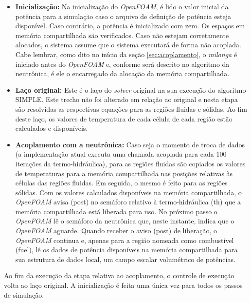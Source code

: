 \begin{itemize}
\item \textbf{Inicialização:} Na inicialização do \textit{OpenFOAM}, é lido o valor inicial da potência para
  a simulação caso o arquivo de definição de potência esteja disponível. Caso contrário, a potência é inicializado
  com zero. Os espaços em memória compartilhada são verificados. Caso não estejam corretamente alocados, o sistema
  assume que o sistema executará de forma não acoplada. Cabe lembrar, como dito no início da seção \ref{sec:acoplamento},
  o \textit{milonga} é iniciado antes do \textit{OpenFOAM} e, conforme será descrito no algoritmo da neutrônica, é
  ele o encarregado da alocação da memória compartilhada.

\item \textbf{Laço original:} Este é o laço do \textit{solver} original na sua execução do algoritmo SIMPLE. Este
  trecho não foi alterado em relação ao original e nesta etapa são resolvidas as respectivas equações
  para as regiões fluidas e sólidas. Ao fim
  deste laço, os valores de temperatura de cada célula de cada região estão calculados e disponíveis.

\item \textbf{Acoplamento com a neutrônica:} Caso seja o momento de troca de dados (a implementação atual
  executa uma chamada acoplada para cada 100 iterações da termo-hidráulica), para as regiões fluidas são copiados os valores
  de temperaturas para a memória compartilhada nas posições relativas às células das regiões fluidas. Em seguida, o mesmo
  é feito para as regiões sólidas. Com os valores calculados disponíveis na memória compartilhada, o \textit{OpenFOAM}
  avisa (post) no semáforo relativo à termo-hidráulica (th) que a memória compartilhada está liberada para uso. No próximo
  passo o \textit{OpenFOAM} lê o semáforo da neutrônica que, neste instante, indica que o \textit{OpenFOAM} aguarde. Quando
  receber o aviso (post) de liberação, o \textit{OpenFOAM} continua e, apenas para a região nomeada como combustível (fuel),
  lê os dados de potência disponíveis na memória compartilhada para sua estrutura de dados local, um campo escalar volumétrico
  de potências.
\end{itemize}

Ao fim da execução da etapa relativa ao acoplamento, o controle de execução volta ao laço original. A inicialização é
feita uma única vez para todos os passos de simulação.

